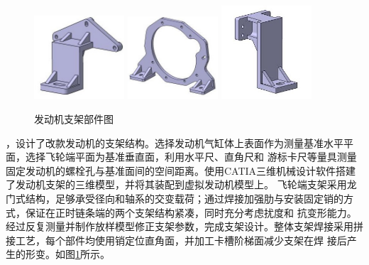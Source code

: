 \begin{figure}[h]
	\centering
	\includegraphics[width=0.3\textwidth]{thesis_figure/platformer_chapter/zj1}
	\includegraphics[width=0.3\textwidth]{thesis_figure/platformer_chapter/zj2}
	\includegraphics[width=0.3\textwidth]{thesis_figure/platformer_chapter/zj3}
	\caption{发动机支架部件图}
	\label{fig:zjbjt}
\end{figure}
，设计了改款发动机的支架结构。选择发动机气缸体上表面作为测量基准水平平面，选择飞轮端平面为基准垂直面，利用水平尺、直角尺和
游标卡尺等量具测量固定发动机的螺栓孔与基准面间的空间距离。使用CATIA三维机械设计软件搭建了发动机支架的三维模型，并将其装配到虚拟发动机模型上。
飞轮端支架采用龙门式结构，足够承受径向和轴系的交变载荷；通过焊接加强肋与安装固定销的方式，保证在正时链条端的两个支架结构紧凑，同时充分考虑扰度和
抗变形能力。经过反复测量并制作放样模型修正支架参数，完成支架设计。整体支架焊接采用拼接工艺，每个部件均使用销定位直角面，并加工卡槽阶梯面减少支架在焊
接后产生的形变。如图\ref{fig:zjbjt}所示。
